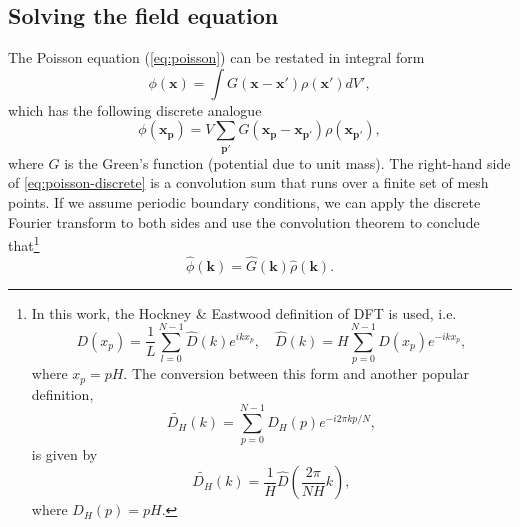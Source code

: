 \subsection{Solving the field equation}
The Poisson equation (\autoref{eq:poisson}) can be restated in integral form
\begin{equation*}
    \phi(\mathbf{x}) = \int G(\mathbf{x}-\mathbf{x}')\rho(\mathbf{x}') dV',
\end{equation*}
which has the following discrete analogue
\begin{equation}\label{eq:poisson-discrete}
    \phi(\mathbf{x}_\mathbf{p}) = V \sum_{\mathbf{p}'} G(\mathbf{x}_\mathbf{p} - \mathbf{x}_{\mathbf{p}'}) \rho(\mathbf{x}_{\mathbf{p}'}),
\end{equation}
where $G$ is the Green's function (potential due to unit mass).
The right-hand side of \autoref{eq:poisson-discrete} is a convolution sum that runs over a finite set of mesh points.
If we assume periodic boundary conditions, we can apply the discrete Fourier transform to both sides and use the convolution theorem to conclude that\footnote{
    In this work, the Hockney \& Eastwood definition of DFT is used, i.e.
    \begin{equation*}
        D(x_p) = \frac{1}{L}\sum_{l=0}^{N-1}\hat{D}(k)e^{ikx_p}, \quad \hat{D}(k) = H\sum_{p=0}^{N-1}D(x_p)e^{-ikx_p},
    \end{equation*}
    where $x_p = pH$.
    The conversion between this form and another popular definition,
    \begin{equation}\label{eq:standard-dft}
        \widetilde{D_H}(k) = \sum_{p=0}^{N-1}D_H(p)e^{-i2\pi kp / N},
    \end{equation}
    is given by
    \begin{equation*}
        \widetilde{D_H}(k) = \frac{1}{H}\hat{D}\left(\frac{2\pi}{NH}k\right),
    \end{equation*}
    where $D_H(p) = pH$.
}
\begin{equation}\label{eq:poisson-fourier-product}
    \hat{\phi}(\mathbf{k}) = \hat{G}(\mathbf{k}) \hat{\rho}(\mathbf{k}).
\end{equation}

